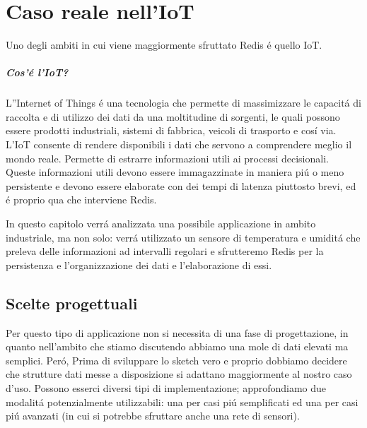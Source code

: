 \chapter{Caso reale nell'IoT}
Uno degli ambiti in cui viene maggiormente sfruttato Redis é quello IoT.
\paragraph{Cos'é l'IoT?\\}
L''Internet of Things é una tecnologia che permette di massimizzare le capacitá di raccolta e di utilizzo
dei dati da una moltitudine di sorgenti, le quali possono essere prodotti industriali, sistemi di fabbrica, veicoli
di trasporto e cosí via.
L'IoT consente di rendere disponibili i dati che servono a comprendere meglio il mondo reale.
Permette di estrarre informazioni utili ai processi decisionali.\\
Queste informazioni utili devono essere immagazzinate in maniera piú o meno persistente
e devono essere elaborate con dei tempi di latenza piuttosto brevi, ed é proprio qua che interviene Redis.

In questo capitolo verrá analizzata una possibile applicazione in ambito industriale, ma non solo:
verrá utilizzato un sensore di temperatura e umiditá che preleva delle informazioni ad intervalli regolari e
sfrutteremo Redis per la persistenza e l'organizzazione dei dati e l'elaborazione di essi.

\section{Scelte progettuali}
Per questo tipo di applicazione non si necessita di una fase di progettazione, in quanto
nell'ambito che stiamo discutendo abbiamo una mole di dati elevati ma semplici.
Peró, Prima di sviluppare lo sketch vero e proprio dobbiamo decidere che strutture dati messe a disposizione si adattano
maggiormente al nostro caso d'uso.
Possono esserci diversi tipi di implementazione; approfondiamo due modalitá potenzialmente utilizzabili:
una per casi piú semplificati ed una per casi piú avanzati (in cui si potrebbe sfruttare anche una rete di sensori).

